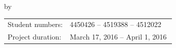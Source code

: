 \begin{titlepage}


\begin{center}


{\makeatletter
\largetitlestyle\fontsize{64}{94}\selectfont\@title
\makeatother}

{\makeatletter
\ifx\@subtitle\undefined\else
    \bigskip
   {\tudsffamily\fontsize{22}{32}\selectfont\@subtitle}    
\fi
\makeatother}

\bigskip
\bigskip

by

\bigskip
\bigskip

{\makeatletter
\titlestyle\fontsize{10}{10}\selectfont\@author
\makeatother}

\bigskip
\bigskip

% 
% 

\vfill

\begin{tabular}{lll}
    Student numbers: & 4450426 -- 4519388 -- 4512022 \\
    Project duration: & \multicolumn{2}{l}{March 17, 2016 -- April 1, 2016} \\
\end{tabular}




\end{center}
\end{titlepage}
